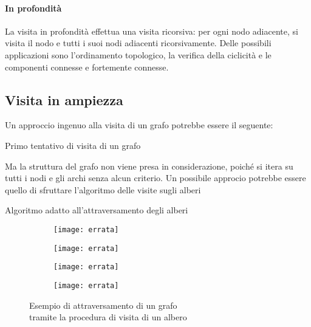 \paragraph{In profondità}
La visita in profondità effettua una visita ricorsiva: per ogni nodo adiacente, si visita il nodo e tutti i suoi nodi adiacenti ricorsivamente.
Delle possibili applicazioni sono l'ordinamento topologico, la verifica della ciclicità e le componenti connesse e fortemente connesse.

\subsection{Visita in ampiezza}

Un approccio ingenuo alla visita di un grafo potrebbe essere il seguente:

\begin{algorithm}[H]
	\caption{Primo tentativo di visita di un grafo}
\end{algorithm}

Ma la struttura del grafo non viene presa in considerazione, poiché si itera su tutti i nodi e gli archi senza alcun criterio.
Un possibile approcio potrebbe essere quello di sfruttare l'algoritmo delle visite sugli alberi

\begin{algorithm}[H]
	\caption{Algoritmo adatto all'attraversamento degli alberi}
	
\end{algorithm}

\clearpage
\begin{figure}[H]
	\centering

	\begin{subfigure}{.5\textwidth}
		\texttt{[image: errata]}
	\end{subfigure}\hfill
	\begin{subfigure}{.5\textwidth}
		\texttt{[image: errata]}
	\end{subfigure}

	\begin{subfigure}{.5\textwidth}
		\texttt{[image: errata]}
	\end{subfigure}\hfill
	\begin{subfigure}{.5\textwidth}
		\texttt{[image: errata]}
	\end{subfigure}

	\caption{Esempio di attraversamento di un grafo\\tramite la procedura di visita di un albero}
\end{figure}

